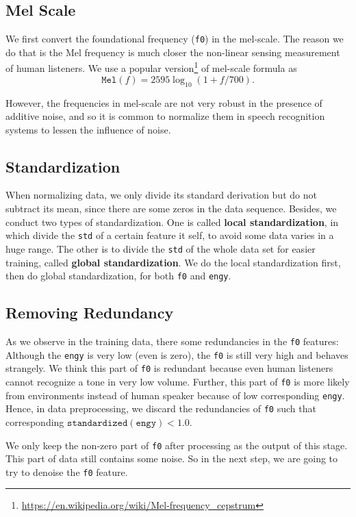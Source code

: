 \documentclass[a4paper]{article}
\begin{document}
\subsection{Mel Scale}
We first convert the foundational frequency (\texttt{f0}) in the mel-scale. The reason we do that is the Mel frequency is much closer the non-linear sensing measurement of human listeners. We use a popular version\footnote{\url{https://en.wikipedia.org/wiki/Mel-frequency_cepstrum}} of mel-scale formula as
	\[\mathtt{Mel}(f) = 2595\log_{10}(1+f/ 700).\]
	
However, the frequencies in mel-scale are not very robust in the presence of additive noise, and so it is common to normalize them in speech recognition systems to lessen the influence of noise.
\subsection{Standardization}
When normalizing data, we only divide its standard derivation but do not subtract its mean, since there are some zeros in the data sequence. Besides, we conduct two types of standardization. One is called \textbf{local standardization}, in which divide the \texttt{std} of a certain feature it self, to avoid some data varies in a huge range. The other is to divide the \texttt{std} of the whole data set for easier training, called \textbf{global standardization}. We do the local standardization first, then do global standardization, for both \texttt{f0} and \texttt{engy}.
\subsection{Removing Redundancy}
As we observe in the training data, there some redundancies in the \texttt{f0} features: Although the \texttt{engy} is very low (even is zero), the \texttt{f0} is still very high and behaves strangely. We think this part of \texttt{f0} is redundant because even human listeners cannot recognize a tone in very low volume. Further, this part of \texttt{f0} is more likely from environments instead of human speaker because of low corresponding \texttt{engy}. Hence, in data preprocessing, we discard the redundancies of \texttt{f0} such that corresponding $\mathtt{standardized(engy)} < 1.0$. 

We only keep the non-zero part of \texttt{f0} after processing as the output of this stage. This part of data still contains some noise. So in the next step, we are going to try to denoise the \texttt{f0} feature.
\end{document}
